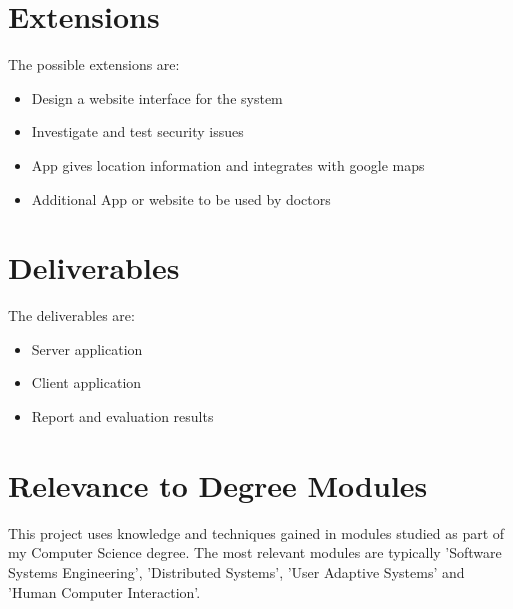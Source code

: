 
\section{Extensions}

The possible extensions are:

\begin{itemize}
	\item Design a website interface for the system
	\item Investigate and test security issues
	\item App gives location information and integrates with google maps
	\item Additional App or website to be used by doctors
\end{itemize}


\section{Deliverables}

The deliverables are:

\begin{itemize}
	\item Server application
	\item Client application
	\item Report and evaluation results
\end{itemize}


\section{Relevance to Degree Modules}

This project uses knowledge and techniques gained in modules studied as part of my Computer Science degree. The most relevant modules are typically 'Software Systems Engineering', 'Distributed Systems', 'User Adaptive Systems' and 'Human Computer Interaction'.

